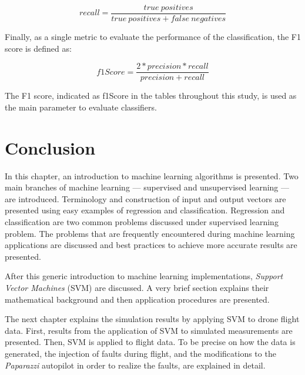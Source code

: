 \begin{equation}
recall = \frac{true \ positives}{true \ positives + false \ negatives}
\end{equation}

Finally, as a single metric to evaluate the performance of the classification, the F1 score is defined as:

\begin{equation}
f1Score = \frac{2 * precision * recall}{precision + recall}
\end{equation}

The F1 score, indicated as f1Score in the tables throughout this study, is used as the main parameter to evaluate classifiers.

\section{Conclusion}
In this chapter, an introduction to machine learning algorithms is presented. 
Two main branches of machine learning --- supervised and unsupervised learning --- are introduced. 
Terminology and construction of input and output vectors are presented using easy examples of regression and classification. 
Regression and classification are two common problems discussed under supervised learning problem. 
The problems that are frequently encountered during machine learning applications are discussed and best practices to achieve more accurate results are presented. 

After this generic introduction to machine learning implementations, \emph{Support Vector Machines} (SVM) are discussed.  
A very brief section explains their mathematical background and then application procedures are presented.

The next chapter explains the simulation results by applying SVM to drone flight data. First, results from the application of SVM to simulated measurements are presented. Then, SVM is applied to flight data. To be precise on how the data is generated, the injection of faults during flight, and the modifications to the \emph{Paparazzi} autopilot in order to realize the faults, are explained in detail.
